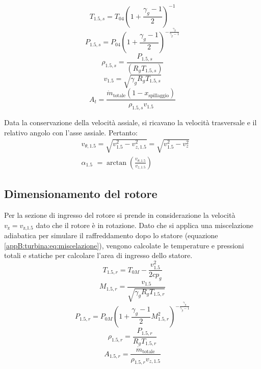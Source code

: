 \begin{equation*}
T_{1.5,s} = T_{04} \left( 1 + \frac{\gamma_g - 1}{2} \right)^{-1}
\end{equation*}
\begin{equation*}
    P_{1.5,s} = P_{04} \left( 1 + \frac{\gamma_g - 1}{2} \right)^{-\frac{\gamma_g}{\gamma_g - 1}} 
\end{equation*}
\begin{equation*}
    \rho_{1.5,s} = \frac{P_{1.5,s}}{(R_g T_{1.5,s})}   
\end{equation*}
\begin{equation*}
    v_{1.5} = \sqrt{\gamma_g R_g T_{1.5,s}}
\end{equation*}
\begin{equation*}
    A_{t} = \frac{\dot{m}_\text{totale}(1-x_\text{spillaggio})}{\rho_{1.5,s} v_{1.5}}
\end{equation*}


Data la conservazione della velocità assiale, si ricavano la velocità trasversale e il relativo angolo con l'asse assiale. Pertanto:
\begin{align*}
    &v_{\theta,1.5} = \sqrt{v_{1.5}^2-v_{z,1.5}^2} =  \sqrt{v_{1.5}^2-v_{z}^2} \\
    &\alpha_{1.5}  \,\,=\arctan\left(\frac{v_{\theta,1.5}}{v_{z,1.5}}\right)
\end{align*}

\subsection{Dimensionamento del rotore}
Per la sezione di ingresso del rotore si prende in considerazione la velocità $v_\text{z} = v_\text{z,1.5}$ dato che il rotore è in rotazione. Dato che si applica una miscelazione adiabatica per simulare il raffreddamento dopo lo statore (equazione \ref{appB:turbina:eq:miscelazione}), vengono calcolate le temperature e pressioni totali e statiche per calcolare l'area di ingresso dello statore. 
\begin{equation*}
T_{1.5,r} = T_{0M} - \frac{v_{1.5}^2}{2cp_g}
\end{equation*}
\begin{equation*}
    M_{1.5,r} = \frac{v_{1.5}}{\sqrt{\gamma_gR_gT_{1.5,r}}}
\end{equation*}
\begin{equation*}
P_{1.5,r}= P_{0M} \left( 1 + \frac{\gamma_g - 1}{2} M_{1.5,r}^2 \right)^{-\frac{\gamma_g}{\gamma_g - 1}} 
\end{equation*}
\begin{equation*}
    \rho_{1.5,r} = \frac{P_{1.5,r}}{R_g T_{1.5,r}} 
\end{equation*}
\begin{equation*}
    A_{{1.5,r}} = \frac{\dot{m}_\text{totale}}{\rho_{{1.5,r}} v_{z,1.5}}
\end{equation*}

